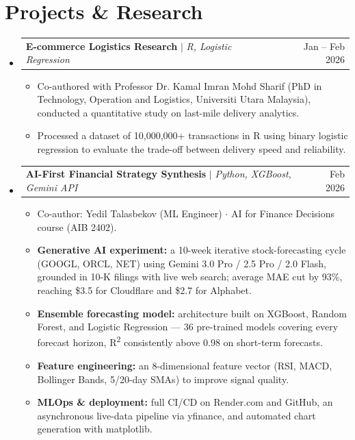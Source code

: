 \documentclass[letterpaper,11pt]{article}
\makeatletter
\newcommand{\resumeItem}[1]{
  \item\small{
    {#1 \vspace{-2pt}}
  }
}
\newcommand{\resumeProjectHeading}[2]{
    \item
    \begin{tabular*}{0.97\textwidth}{l@{\extracolsep{\fill}}r}
      \small#1 & #2 \\
    \end{tabular*}\vspace{-7pt}
}
\newcommand{\resumeSubHeadingListStart}{\begin{itemize}[leftmargin=0.15in, label={}]}
\newcommand{\resumeSubHeadingListEnd}{\end{itemize}}
\newcommand{\resumeItemListStart}{\begin{itemize}}
\newcommand{\resumeItemListEnd}{\end{itemize}\vspace{-5pt}}
\makeatother
\begin{document}
\section{Projects \& Research}
    \resumeSubHeadingListStart
      \resumeProjectHeading
          {\textbf{E-commerce Logistics Research} $|$ \emph{R, Logistic Regression}}{Jan -- Feb 2026}
          \resumeItemListStart
            \resumeItem{Co-authored with Professor Dr. Kamal Imran Mohd Sharif (PhD in Technology, Operation and Logistics, Universiti Utara Malaysia), conducted a quantitative study on last-mile delivery analytics.}
            \resumeItem{Processed a dataset of 10,000,000+ transactions in R using binary logistic regression to evaluate the trade-off between delivery speed and reliability.}
          \resumeItemListEnd
      \resumeProjectHeading
          {\textbf{AI-First Financial Strategy Synthesis} $|$ \emph{Python, XGBoost, Gemini API}}{Feb 2026}
          \resumeItemListStart
            \resumeItem{Co-author: Yedil Talasbekov (ML Engineer) $\cdot$ AI for Finance Decisions course (AIB 2402).}
            \resumeItem{\textbf{Generative AI experiment:} a 10-week iterative stock-forecasting cycle (GOOGL, ORCL, NET) using Gemini 3.0 Pro / 2.5 Pro / 2.0 Flash, grounded in 10-K filings with live web search; average MAE cut by 93\%, reaching \$3.5 for Cloudflare and \$2.7 for Alphabet.}
            \resumeItem{\textbf{Ensemble forecasting model:} architecture built on XGBoost, Random Forest, and Logistic Regression — 36 pre-trained models covering every forecast horizon, R\textsuperscript{2} consistently above 0.98 on short-term forecasts.}
            \resumeItem{\textbf{Feature engineering:} an 8-dimensional feature vector (RSI, MACD, Bollinger Bands, 5/20-day SMAs) to improve signal quality.}
            \resumeItem{\textbf{MLOps \& deployment:} full CI/CD on Render.com and GitHub, an asynchronous live-data pipeline via yfinance, and automated chart generation with matplotlib.}
          \resumeItemListEnd
    \resumeSubHeadingListEnd


\end{document}
